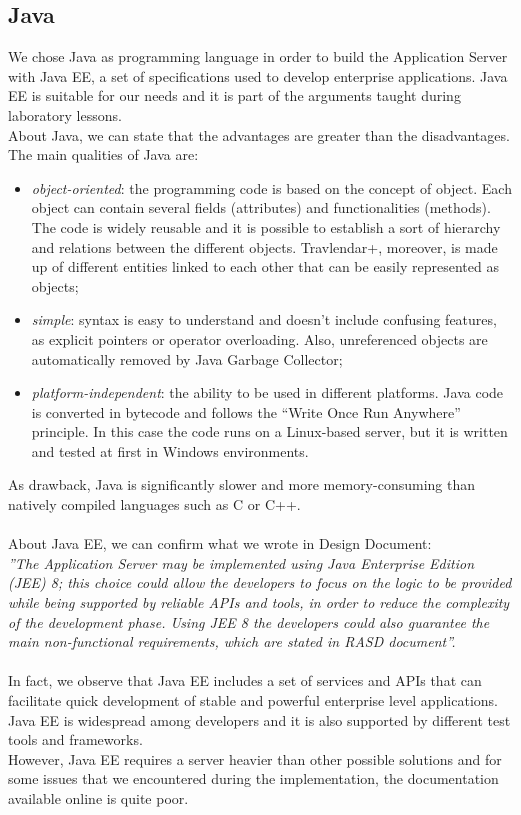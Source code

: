 \subsection{Java}
\label{subsect:Java}
We chose Java as programming language in order to build the Application Server with Java EE, a set of specifications used to develop enterprise applications. Java EE is suitable for our needs and it is part of the arguments taught during laboratory lessons.\\
About Java, we can state that the advantages are greater than the disadvantages. \\
The main qualities of Java are:
\begin{itemize}
\item \textit{object-oriented}: the programming code is based on the concept of object. Each object can contain several fields (attributes) and functionalities (methods). The code is widely reusable and it is possible to establish a sort of hierarchy and relations between the different objects. Travlendar+, moreover, is made up of different entities linked to each other that can be easily represented as objects;
\item \textit{simple}: syntax is easy to understand and doesn’t include confusing features, as explicit pointers or operator overloading. Also, unreferenced objects are automatically removed by Java Garbage Collector;
\item \textit{platform-independent}: the ability to be used in different platforms. Java code is converted in bytecode and follows the “Write Once Run Anywhere” principle. In this case the code runs on a Linux-based server, but it is written and tested at first in Windows environments. 
\end{itemize}
As drawback, Java is significantly slower and more memory-consuming than natively compiled languages such as C or C++.\\\\
About Java EE, we can confirm what we wrote in Design Document:\\
\textit{''The Application Server may be implemented using Java Enterprise Edition (JEE) 8; this choice could allow the developers to focus on the logic to be provided while being supported by reliable APIs and tools, in order to reduce the complexity of the development phase. Using JEE 8 the developers could also guarantee the main non-functional requirements, which are stated in RASD document''.}\\\\
In fact, we observe that Java EE includes a set of services and APIs that can facilitate quick development of stable and powerful enterprise level applications. Java EE is widespread among developers and it is also supported by different test tools and frameworks.\\
However, Java EE requires a server heavier than other possible solutions and for some issues that we encountered during the implementation, the documentation available online is quite poor. 
